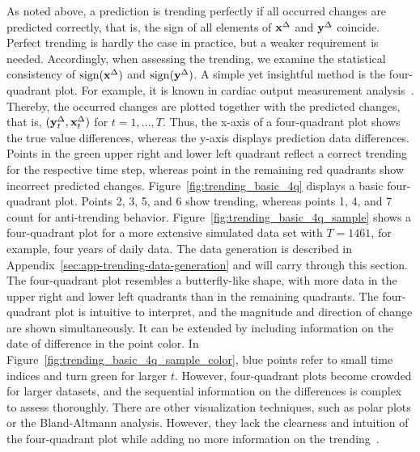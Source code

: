 As noted above, a prediction is trending perfectly if all occurred changes are predicted correctly, that is, the sign of all elements of $\mathbf{x}^{\Delta}$ and $\mathbf{y}^{\Delta}$ coincide.
Perfect trending is hardly the case in practice, but a weaker requirement is needed.
Accordingly, when assessing the trending, we examine the statistical consistency of $\operatorname{sign}(\mathbf{x}^{\Delta})$ and $\operatorname{sign}(\mathbf{y}^{\Delta})$.
A simple yet insightful method is the four-quadrant plot.
For example, it is known in cardiac output measurement analysis~\parencite{Saugel2015}. 
Thereby, the occurred changes are plotted together with the predicted changes, that is, $(\mathbf{y}^{\Delta}_t, \mathbf{x}^{\Delta}_t)$ for $t = 1, \dots, T$.
Thus, the x-axis of a four-quadrant plot shows the true value differences, whereas the y-axis displays prediction data differences.
Points in the green upper right and lower left quadrant reflect a correct trending for the respective time step, whereas point in the remaining red quadrants show incorrect predicted changes.
Figure~\ref{fig:trending_basic_4q} displays a basic four-quadrant plot.
Points 2, 3, 5, and 6 show trending, whereas points 1, 4, and 7 count for anti-trending behavior.
Figure~\ref{fig:trending_basic_4q_sample} shows a four-quadrant plot for a more extensive simulated data set with $T=1461$, for example, four years of daily data.
The data generation is described in Appendix~\ref{sec:app-trending-data-generation} and will carry through this section.
The four-quadrant plot resembles a butterfly-like shape, with more data in the upper right and lower left quadrants than in the remaining quadrants.
The four-quadrant plot is intuitive to interpret, and the magnitude and direction of change are shown simultaneously.
It can be extended by including information on the date of difference in the point color.
In Figure~\ref{fig:trending_basic_4q_sample_color}, blue points refer to small time indices and turn green for larger $t$.
However, four-quadrant plots become crowded for larger datasets, and the sequential information on the differences is complex to assess thoroughly.
There are other visualization techniques, such as polar plots or the Bland-Altmann analysis.
However, they lack the clearness and intuition of the four-quadrant plot while adding no more information on the trending~\parencite{Saugel2015}.

